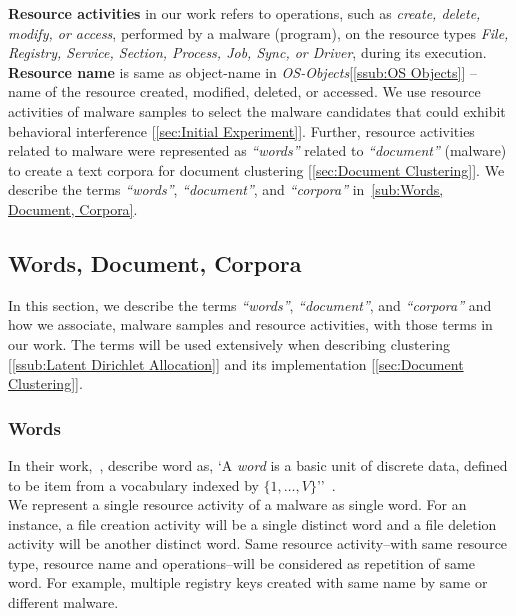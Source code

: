 \textbf{Resource activities} in our work refers to operations, such as \emph{create, delete, modify, or access}, performed by a malware (program), on the resource types \emph{File, Registry, Service, Section, Process, Job, Sync, or Driver}, during its execution.
\textbf{Resource name} is same as object-name in \emph{OS-Objects}[\autoref{ssub:OS Objects}] -- name of the resource created, modified, deleted, or accessed.
We use resource activities of malware samples to select the malware candidates that could exhibit behavioral interference [\autoref{sec:Initial Experiment}].
Further, resource activities related to malware were represented as \emph{``words''} related to \emph{``document''} (malware) to create a text corpora for document clustering [\autoref{sec:Document Clustering}].
We describe the terms \emph{``words''}, \emph{``document''}, and \emph{``corpora''} in~\autoref{sub:Words, Document, Corpora}.
\subsection{Words, Document, Corpora}
\label{sub:Words, Document, Corpora}
In this section, we describe the terms \emph{``words''}, \emph{``document''}, and \emph{``corpora''} and how we associate, malware samples and resource activities, with those terms in our work.
The terms will be used extensively when describing clustering [\autoref{ssub:Latent Dirichlet Allocation}] and its implementation [\autoref{sec:Document Clustering}].
\subsubsection{Words}
\label{ssub:Words}
In their work,~\citeauthor{Blei}, describe word as, `A \emph{word} is a basic unit of discrete data, defined to be item from a vocabulary indexed by $\{1,\ldots,V\}$''~\cite[]{Blei}.\\
We represent a single resource activity of a malware as single word.
For an instance, a file creation activity will be a single distinct word and a file deletion activity will be another distinct word.
Same resource activity--with same resource type, resource name and operations--will be considered as repetition of same word.
For example, multiple registry keys created with same name by same or different malware.
